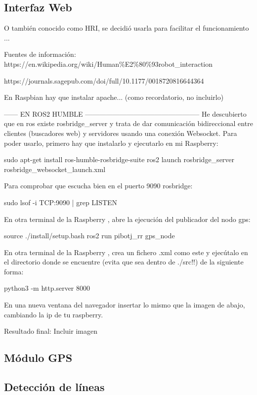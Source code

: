 \subsection{Interfaz Web}
\label{subsec:softwareweb}

O también conocido como HRI, se decidió usarla para facilitar el funcionamiento ...

Fuentes de información: 
https://en.wikipedia.org/wiki/Human\%E2\%80\%93robot\_interaction

https://journals.sagepub.com/doi/full/10.1177/0018720816644364


En Raspbian  hay que instalar apache... (como recordatorio, no incluirlo)


------ EN ROS2 HUMBLE --------------------------------------------------
He descubierto que en ros existe rosbridge\_server y trata de dar comunicación bidireccional entre clientes (buscadores web) y servidores usando una conexión Websocket. Para poder usarlo, primero hay que instalarlo y ejecutarlo en mi Raspberry:

sudo apt-get install ros-humble-rosbridge-suite
ros2 launch rosbridge\_server rosbridge\_websocket\_launch.xml

Para comprobar que escucha bien en el puerto 9090 rosbridge:

sudo lsof -i TCP:9090 | grep LISTEN

En otra terminal de la Raspberry , abre la ejecución del publicador del nodo gps:

source ./install/setup.bash
ros2 run pibotj\_rr gps\_node

En otra terminal de la Raspberry , crea un fichero .xml como este y ejecútalo en el directorio donde se encuentre (evita que sea dentro de ./src!!) de la siguiente forma:

python3 -m http.server 8000

En una nueva ventana del navegador insertar lo mismo que la imagen de abajo, cambiando la ip de tu raspberry.

Resultado final: Incluir imagen

\subsection{Módulo GPS}
\label{subsec:softwaregps}

\subsection{Detección de líneas}
\label{subsec:softwaredl}

